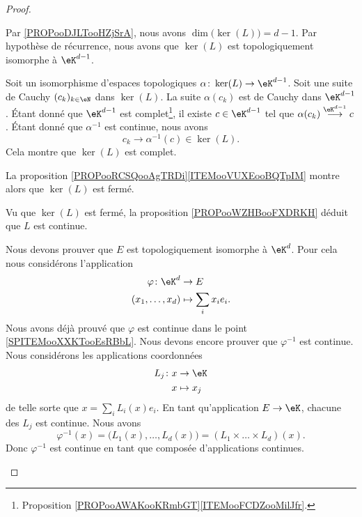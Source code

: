 \begin{proof}
\begin{subproof}
		\spitem[Déductions]
		Par \ref{PROPooDJLTooHZjSrA}, nous avons \( \dim\big( \ker(L) \big)=d-1\). Par hypothèse de récurrence, nous avons que \( \ker(L)\) est topologiquement isomorphe à \( \eK^{d-1}\).

		Soit un isomorphisme d'espaces topologiques \(\alpha \colon \ker(L)\to \eK^{d-1}  \). Soit une suite de Cauchy \( (c_k)_{k\in \eN}\) dans \( \ker(L)\). La suite \( \alpha(c_k)\) est de Cauchy dans \( \eK^{d-1}\). Étant donné que \( \eK^{d-1}\) est complet\footnote{Proposition \ref{PROPooAWAKooKRmbGT}\ref{ITEMooFCDZooMilJfr}.}, il existe \( c\in \eK^{d-1}\) tel que \( \alpha(c_k)\stackrel{ \eK^{d-1}}{\longrightarrow}  c\). Étant donné que \( \alpha^{-1}\) est continue, nous avons
		\begin{equation}
			c_k\to \alpha^{-1}(c)\in \ker(L).
		\end{equation}
		Cela montre que \( \ker(L)\) est complet.

		La proposition \ref{PROPooRCSQooAgTRDi}\ref{ITEMooVUXEooBQTpIM} montre alors que \( \ker(L)\) est fermé.

		Vu que \( \ker(L)\) est fermé, la proposition \ref{PROPooWZHBooFXDRKH} déduit que \( L\) est continue.

		Nous devons prouver que \( E\) est topologiquement isomorphe à \( \eK^d\). Pour cela nous considérons l'application
		\begin{equation}
			\begin{aligned}
				\varphi\colon \eK^d & \to E                 \\
				(x_1,\ldots,x_d)    & \mapsto \sum_ix_ie_i.
			\end{aligned}
		\end{equation}
		Nous avons déjà prouvé que \( \varphi\) est continue dans le point \ref{SPITEMooXXKTooEsRBbL}. Nous devons encore prouver que \( \varphi^{-1}\) est continue. Nous considérons les applications coordonnées
		\begin{equation}
			\begin{aligned}
				L_j\colon x & \to \eK     \\
				x           & \mapsto x_j
			\end{aligned}
		\end{equation}
		de telle sorte que \( x=\sum_i L_i(x)e_i\). En tant qu'application \( E\to \eK\), chacune des \( L_j\) est continue. Nous avons
		\begin{equation}
			\varphi^{-1}(x)=\big( L_1(x),\ldots,L_d(x) \big)=(L_1\times\ldots\times L_d)(x).
		\end{equation}
		Donc \( \varphi^{-1}\) est continue en tant que composée d'applications continues.


\end{subproof}
\end{proof}
